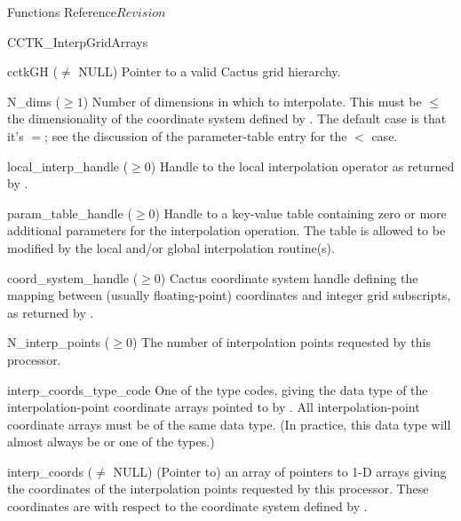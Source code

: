 \begin{cactuspart}{ Functions Reference}{}{$Revision$}
\begin{FunctionDescription}{CCTK\_InterpGridArrays}
\begin{ParameterSection}
\begin{Parameter}{cctkGH ($\ne$ NULL)}
Pointer to a valid Cactus grid hierarchy.
\end{Parameter}
\begin{Parameter}{N\_dims ($\ge 1$)}
Number of dimensions in which to interpolate.
This must be $\leq$ the dimensionality of the coordinate system defined
by .  The default case is that it's $=$; see
the discussion of the  parameter-table
entry for the $<$ case.
\end{Parameter}
\begin{Parameter}{local\_interp\_handle ($\ge 0$)}
Handle to the local interpolation operator as returned by
.
\end{Parameter}
\begin{Parameter}{param\_table\_handle ($\ge 0$)}
Handle to a key-value table containing zero or more additional parameters
for the interpolation operation. The table is allowed to be modified by the
local and/or global interpolation routine(s).
\end{Parameter}
\begin{Parameter}{coord\_system\_handle ($\ge 0$)}
Cactus coordinate system handle defining the mapping between
(usually floating-point) coordinates and integer grid subscripts, as returned by
.
\end{Parameter}
\begin{Parameter}{N\_interp\_points ($\ge 0$)}
The number of interpolation points requested by this processor.
\end{Parameter}
\begin{Parameter}{interp\_coords\_type\_code}
One of the  type codes, giving the data type of the
interpolation-point coordinate arrays pointed to by .
All interpolation-point coordinate arrays must be of the same data type.
(In practice, this data type will almost always be 
or one of the  types.)
\end{Parameter}
\begin{Parameter}{interp\_coords ($\ne$ NULL)}
(Pointer to) an array of  pointers to 1-D arrays giving the
coordinates of the interpolation points requested by this processor.
These coordinates are with respect to the coordinate system defined by
.
\end{Parameter}

\end{ParameterSection}
\end{FunctionDescription}
\end{cactuspart}
